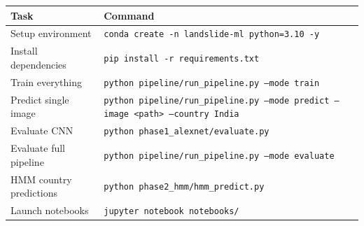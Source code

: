 \documentclass[11pt]{article}
\begin{document}
\begin{table}[H]
    \centering
    \renewcommand{\arraystretch}{1.4}
    \begin{tabular}{p{4.5cm}p{9.5cm}}
        \toprule
        \textbf{Task} & \textbf{Command} \\
        \midrule
        Setup environment & \texttt{conda create -n landslide-ml python=3.10 -y} \\
        Install dependencies & \texttt{pip install -r requirements.txt} \\
        Train everything & \texttt{python pipeline/run\_pipeline.py --mode train} \\
        Predict single image & \texttt{python pipeline/run\_pipeline.py --mode predict --image <path> --country India} \\
        Evaluate CNN & \texttt{python phase1\_alexnet/evaluate.py} \\
        Evaluate full pipeline & \texttt{python pipeline/run\_pipeline.py --mode evaluate} \\
        HMM country predictions & \texttt{python phase2\_hmm/hmm\_predict.py} \\
        Launch notebooks & \texttt{jupyter notebook notebooks/} \\
        \bottomrule
    \end{tabular}
\end{table}
\end{document}
